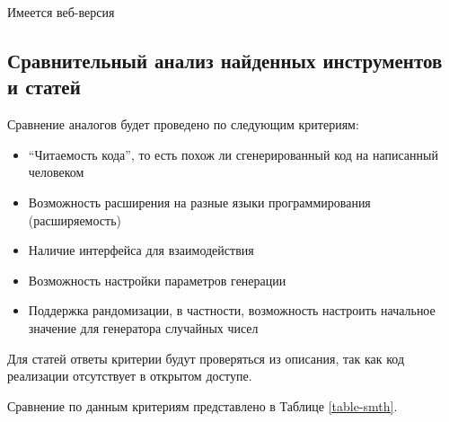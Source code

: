 Имеется веб-версия \cite{pyfuzz-web}

\subsection{Сравнительный анализ найденных инструментов и статей}

Сравнение аналогов будет проведено по следующим критериям:
\begin{itemize}
    \item “Читаемость кода”, то есть похож ли сгенерированный код на написанный человеком
    \item Возможность расширения на разные языки программирования (расширяемость)
    \item Наличие интерфейса для взаимодействия
    \item Возможность настройки параметров генерации
    \item Поддержка рандомизации, в частности, возможность настроить начальное значение для генератора случайных чисел
\end{itemize}

Для статей ответы критерии будут проверяться из описания, так как код реализации отсутствует в открытом доступе.

Сравнение по данным критериям представлено в Таблице \ref{table-smth}.


